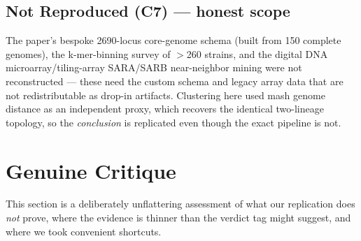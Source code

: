 \documentclass[11pt]{article}
\begin{document}
\subsection{Not Reproduced (C7) ---  honest scope}
The paper's bespoke 2690-locus core-genome schema (built from 150 complete genomes), the k-mer-binning survey of $>$260 strains, and the digital DNA microarray/tiling-array SARA/SARB near-neighbor mining were not reconstructed --- these need the custom schema and legacy array data that are not redistributable as drop-in artifacts. Clustering here used mash genome distance as an independent proxy, which recovers the identical two-lineage topology, so the \emph{conclusion} is replicated even though the exact pipeline is not.

\section{Genuine Critique}
This section is a deliberately unflattering assessment of what our replication does \emph{not} prove, where the evidence is thinner than the verdict tag might suggest, and where we took convenient shortcuts.
\end{document}
